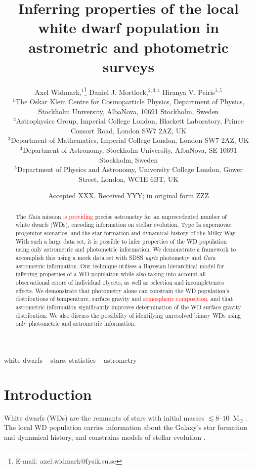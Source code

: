 \documentclass[fleqn,usenatbib]{mnras}
\title[Inferring properties of the white dwarf population]{Inferring properties of the local white dwarf population in astrometric and photometric surveys}
\author[A. Widmark et al.]{
Axel Widmark,$^1$\thanks{E-mail: axel.widmark@fysik.su.se} 
Daniel J. Mortlock,$^{2,3,4}$
Hiranya V. Peiris$^{1,5}$
\\
$^1$The Oskar Klein Centre for Cosmoparticle Physics, Department of
Physics, Stockholm University, AlbaNova, 10691 Stockholm, Sweden\\
$^2$Astrophysics Group, Imperial College London, Blackett Laboratory, Prince Consort Road, London SW7 2AZ, UK\\
$^3$Department of Mathematics, Imperial College London, London SW7 2AZ, UK\\
$^4$Department of Astronomy, Stockholm University, AlbaNova, SE-10691 Stockholm, Sweden\\
$^5$Department of Physics and Astronomy, University College London, Gower Street, London, WC1E 6BT, UK\\
}
\date{Accepted XXX. Received YYY; in original form ZZZ}
\newcommand{\changes}[1]{\textcolor{red}{#1}}
\begin{document}
\label{firstpage}
\pagerange{\pageref{firstpage}--\pageref{lastpage}}
\maketitle

\begin{abstract}
The \emph{Gaia} mission \changes{is providing} precise astrometry for an unprecedented number of white dwarfs (WDs), encoding information on stellar evolution, Type Ia supernovae progenitor scenarios, and the star formation and dynamical history of the Milky Way. With such a large data set, it is possible to infer properties of the WD population using only astrometric and photometric information. We demonstrate a framework to accomplish this using a mock data set with SDSS \emph{ugriz} photometry and \emph{Gaia} astrometric information.
Our technique utilises a Bayesian hierarchical model for inferring properties of a WD population while also taking into account all observational errors of individual objects, as well as selection and incompleteness effects.
We demonstrate that photometry alone can constrain the WD population's  distributions of temperature, surface gravity and \changes{atmospheric composition}, and that astrometric information significantly improves determination of the WD surface gravity distribution. We also discuss the possibility of identifying unresolved binary WDs using only photometric and astrometric information.
\end{abstract}

\begin{keywords}
white dwarfs -- stars: statistics -- astrometry
\end{keywords}









\section{Introduction}

White dwarfs (WDs) are the remnants of stars with initial masses $\lesssim8\mbox{--}10$~M$_\odot$ \citep{1996ApJ...460..489R,2009MNRAS.395.1409S}. The local WD population carries information about the Galaxy's star formation and dynamical history, and constrains models of stellar evolution \citep{1987ApJ...315L..77W,2016NewAR..72....1G,2018arXiv180505849E}.
\end{document}
